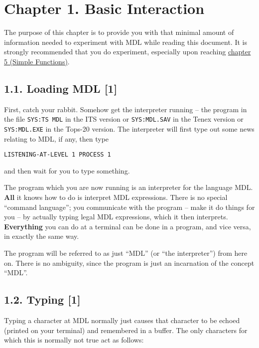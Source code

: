 \documentclass[a4paper,]{article}
\begin{document}
\section{Chapter 1. Basic Interaction}\label{chapter-1.-basic-interaction}

The purpose of this chapter is to provide you with that minimal amount of information needed to experiment with MDL while
reading this document. It is strongly recommended that you do experiment, especially upon reaching
\href{05-simple-functions.md}{chapter 5 (Simple Functions)}.

\subsection{1.1. Loading MDL {[}1{]}}\label{loading-mdl-1}

First, catch your rabbit. Somehow get the interpreter running -- the program in the file \texttt{SYS:TS\ MDL} in the ITS
version or \texttt{SYS:MDL.SAV} in the Tenex version or \texttt{SYS:MDL.EXE} in the Tops-20 version. The interpreter will
first type out some news relating to MDL, if any, then type

\begin{verbatim}
LISTENING-AT-LEVEL 1 PROCESS 1
\end{verbatim}

and then wait for you to type something.

The program which you are now running is an interpreter for the language MDL. \textbf{All} it knows how to do is interpret
MDL expressions. There is no special ``command language''; you communicate with the program -- make it do things for you --
by actually typing legal MDL expressions, which it then interprets. \textbf{Everything} you can do at a terminal can be
done in a program, and vice versa, in exactly the same way.

The program will be referred to as just ``MDL'' (or ``the interpreter'') from here on. There is no ambiguity, since the
program is just an incarnation of the concept ``MDL''.

\subsection{1.2. Typing {[}1{]}}\label{typing-1}

Typing a character at MDL normally just causes that character to be echoed (printed on your terminal) and remembered in a
buffer. The only characters for which this is normally not true act as follows:
\end{document}
